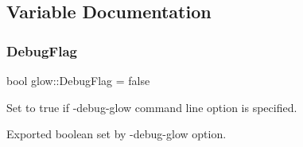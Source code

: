 \subsection{Variable Documentation}
\mbox{\label{namespaceglow_ad352d0b626337dc5b2e9ef7593268075}} 
\subsubsection{\texorpdfstring{Debug\+Flag}{DebugFlag}}
{\footnotesize\ttfamily bool glow\+::\+Debug\+Flag = false}



Set to true if \textquotesingle{}-\/debug-\/glow\textquotesingle{} command line option is specified. 

Exported boolean set by -\/debug-\/glow option. 